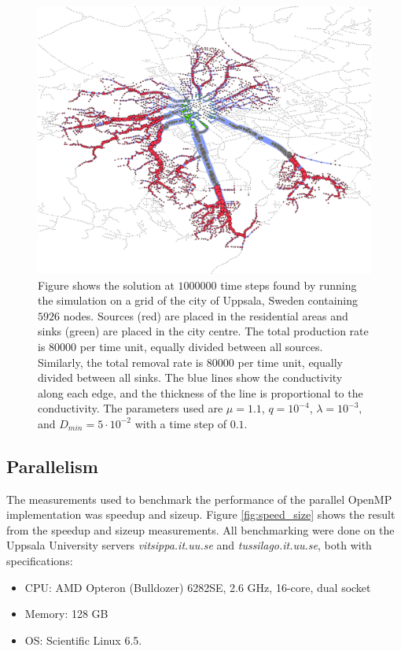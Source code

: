 \begin{figure}
\centering
\includegraphics[width=\textwidth]{img/uppsala.png}
\caption{Figure shows the solution at $1000000$ time steps found by running the simulation on a grid of the city of Uppsala, Sweden containing $5926$ nodes. Sources (red) are placed in the residential areas and sinks (green) are placed in the city centre. The total production rate is $80000$ per time unit, equally divided between all sources. Similarly, the total removal rate is $80000$ per time unit, equally divided between all sinks. The blue lines show the conductivity along each edge, and the thickness of the line is proportional to the conductivity. The parameters used are $\mu = 1.1$, $q = 10^{-4}$, $\lambda = 10^{-3},$ and $D_{min}=5 \cdot 10^{-2}$ with a time step of $0.1$.}
\label{fig:uppsala}
\end{figure}

\subsection{Parallelism}
The measurements used to benchmark the performance of the parallel OpenMP implementation was speedup and sizeup. Figure \ref{fig:speed_size} shows the result from the speedup and sizeup measurements. All benchmarking were done on the Uppsala University servers \textit{vitsippa.it.uu.se} and \textit{tussilago.it.uu.se}, both with specifications: 

\begin{itemize}
\item CPU: AMD Opteron (Bulldozer) 6282SE, 2.6 GHz, 16-core, dual socket
\item Memory: 128 GB
\item OS: Scientific Linux 6.5.
\end{itemize}

